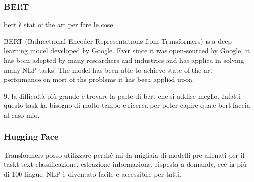 \subsubsection{BERT}
bert è stat of the art per fare le cose

BERT (Bidirectional Encoder Representations from Transformers) is a deep learning model developed by Google. Ever since it was open-sourced by Google, it has been adopted by many researchers and industries and has applied in solving many NLP tasks. The model has been able to achieve state of the art performance on most of the problems it has been applied upon.

9.	la difficoltà più grande è trovare la parte di bert che si addice meglio.
Infatti questo task ha bisogno di molto tempo e ricerca per poter capire quale bert faccia al caso mio.


\subsubsection{Hugging Face}
Transformers posso utilizzare perché mi da migliaia di modelli pre allenati per il taskt text classificazione, estrazione informazione, risposta a domande, ecc in più di 100 lingue.
NLP è diventato facile e accessibile per tutti.

